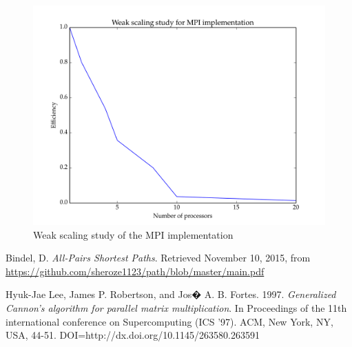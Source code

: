 \documentclass[11pt]{article}
\begin{document}
\begin{figure}[H]
\centering
\includegraphics[scale=0.5]{./scaling_studies/weak_scaling_mpi.png}
\caption{Weak scaling study of the MPI implementation}
\label{fig:ws_mpi}
\end{figure}


\begin{thebibliography}{9}
Bindel, D. \textit{All-Pairs Shortest Paths}. Retrieved November 10, 2015, from \url{https://github.com/sheroze1123/path/blob/master/main.pdf}

Hyuk-Jae Lee, James P. Robertson, and Jos� A. B. Fortes. 1997. \textit{Generalized Cannon's algorithm for parallel matrix multiplication}. In Proceedings of the 11th international conference on Supercomputing (ICS '97). ACM, New York, NY, USA, 44-51. DOI=http://dx.doi.org/10.1145/263580.263591

\end{thebibliography}

 
 
\end{document}
